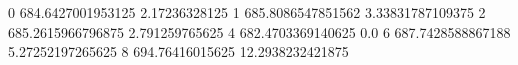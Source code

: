 0 684.6427001953125 2.17236328125
1 685.8086547851562 3.33831787109375
2 685.2615966796875 2.791259765625
4 682.4703369140625 0.0
6 687.7428588867188 5.27252197265625
8 694.76416015625 12.2938232421875
